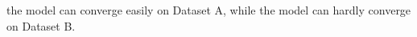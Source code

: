 \begin{answer}
the model can converge easily on Dataset A, while the model can hardly converge on Dataset B.
\end{answer}
